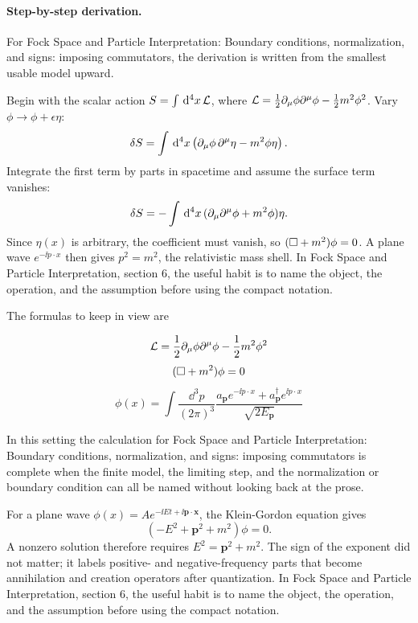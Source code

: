 \paragraph{Step-by-step derivation.}

For Fock Space and Particle Interpretation: Boundary conditions, normalization, and signs: imposing commutators, the derivation is written from the smallest usable model upward.

Begin with the scalar action \(S=\int\,\mathrm d^4x\,\mathcal L\), where \(\mathcal L=\frac12\partial_\mu\phi\partial^\mu\phi-\frac12m^2\phi^2\).  Vary \(\phi\to\phi+\epsilon\eta\):
\[
  \delta S=\int\,\mathrm d^4x\left(\partial_\mu\phi\,\partial^\mu\eta-m^2\phi\eta\right).
\]
Integrate the first term by parts in spacetime and assume the surface term vanishes:
\[
  \delta S=-\int\,\mathrm d^4x\,(\partial_\mu\partial^\mu\phi+m^2\phi)\eta.
\]
Since \(\eta(x)\) is arbitrary, the coefficient must vanish, so \((\Box+m^2)\phi=0\).  A plane wave \(e^{-\ii p\cdot x}\) then gives \(p^2=m^2\), the relativistic mass shell.  In Fock Space and Particle Interpretation, section 6, the useful habit is to name the object, the operation, and the assumption before using the compact notation.

The formulas to keep in view are

\[
  \mathcal L=\frac12\partial_\mu\phi\partial^\mu\phi-\frac12m^2\phi^2
\]
\[
  (\Box+m^2)\phi=0
\]
\[
  \phi(x)=\int\frac{\dd^3p}{(2\pi)^3}\frac{a_{\bm p}e^{-\ii p\cdot x}+a_{\bm p}^\dagger e^{\ii p\cdot x}}{\sqrt{2E_{\bm p}}}
\]

In this setting the calculation for Fock Space and Particle Interpretation: Boundary conditions, normalization, and signs: imposing commutators is complete when the finite model, the limiting step, and the normalization or boundary condition can all be named without looking back at the prose.




\begin{example}
For a plane wave \(\phi(x)=Ae^{-\ii Et+\ii\bm p\cdot\bm x}\), the Klein-Gordon equation gives
\[
  (-E^2+\bm p^2+m^2)\phi=0.
\]
A nonzero solution therefore requires \(E^2=\bm p^2+m^2\).  The sign of the exponent did not matter; it labels positive- and negative-frequency parts that become annihilation and creation operators after quantization.  In Fock Space and Particle Interpretation, section 6, the useful habit is to name the object, the operation, and the assumption before using the compact notation.
\end{example}



